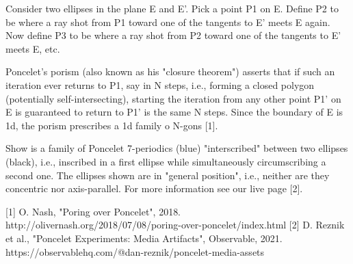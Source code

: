 Consider two ellipses in the plane E and E'. Pick a point P1 on E. Define P2 to be where a ray shot from P1 toward one of the tangents to E' meets E again. Now define P3 to be where a ray shot from P2 toward one of the tangents to E' meets E, etc.

Poncelet's porism (also known as his "closure theorem") asserts that if such an iteration ever returns to P1, say in N steps, i.e., forming a closed polygon (potentially self-intersecting), starting the iteration from any other point P1' on E is guaranteed to return to P1' is the same N steps. Since the boundary of E is 1d, the porism prescribes a 1d family o N-gons [1].

Show is a family of Poncelet 7-periodics (blue) "interscribed" between two ellipses (black), i.e., inscribed in a first ellipse while simultaneously circumscribing a second one. The ellipses shown are in "general position", i.e., neither are they concentric nor axis-parallel. For more information see our live page [2].

[1] O. Nash, "Poring over Poncelet", 2018. http://olivernash.org/2018/07/08/poring-over-poncelet/index.html 
[2] D. Reznik et al., "Poncelet Experiments: Media Artifacts", Observable, 2021. https://observablehq.com/@dan-reznik/poncelet-media-assets